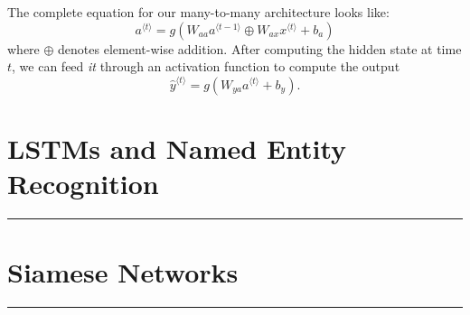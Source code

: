 \documentclass[12pt]{article}
\begin{document}
The complete equation for our many-to-many architecture looks like:
\[
  a^{\langle t\rangle} = g\left(W_{aa} a^{\langle t-1 \rangle} \oplus W_{ax} x^{\langle t \rangle} + b_a\right)
\]
where $\oplus$ denotes element-wise addition. After computing the hidden state at time $t$, we can feed \emph{it} through an activation function to compute the output
\[
  \hat y^{\langle t \rangle} = g\left(W_{ya} a^{\langle t \rangle} + b_y \right).
\]



\section{LSTMs and Named Entity Recognition}\vspace{.1pt} \hrule height 2pt \smallskip \renewcommand{\arraystretch}{1}%
\section{Siamese Networks}\vspace{.1pt} \hrule height 2pt \smallskip \renewcommand{\arraystretch}{1}%
\end{document}
